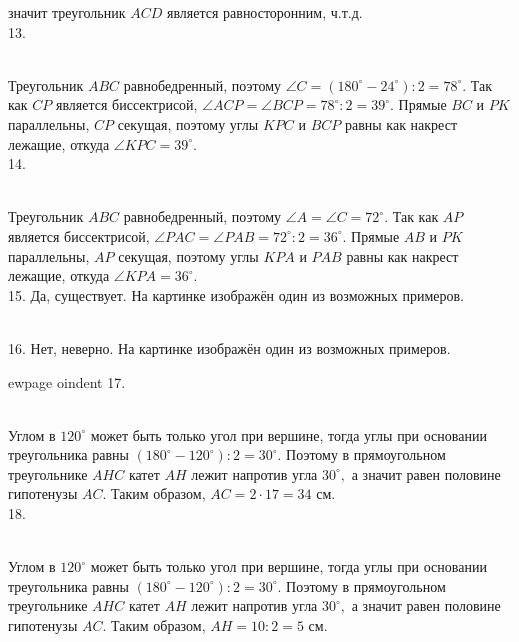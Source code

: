значит треугольник $ACD$ является равносторонним, ч.т.д.\\
13. \begin{figure}[ht!]
\end{figure}\\
Треугольник $ABC$ равнобедренный, поэтому $\angle C=(180^\circ-24^\circ):2=78^\circ.$ Так как $CP$ является биссектрисой, $\angle ACP=\angle BCP=78^\circ:2=39^\circ.$ Прямые $BC$ и $PK$ параллельны, $CP$ секущая, поэтому углы $KPC$ и $BCP$ равны как накрест лежащие, откуда $\angle KPC=39^\circ.$\\
14. \begin{figure}[ht!]
\end{figure}\\
Треугольник $ABC$ равнобедренный, поэтому $\angle A=\angle C =72^\circ.$ Так как $AP$ является биссектрисой, $\angle PAC=\angle PAB=72^\circ:2=36^\circ.$ Прямые $AB$ и $PK$ параллельны, $AP$ секущая, поэтому углы $KPA$ и $PAB$ равны как накрест лежащие, откуда $\angle KPA=36^\circ.$\\
15. Да, существует. На картинке изображён один из возможных примеров.
\begin{figure}[ht!]
\end{figure}\\
16. Нет, неверно. На картинке изображён один из возможных примеров.
\begin{figure}[ht!]
\end{figure}
ewpage
oindent
17. \begin{figure}[ht!]
\end{figure}\\
Углом в $120^\circ$ может быть только угол при вершине, тогда углы при основании треугольника равны $(180^\circ-120^\circ):2=30^\circ.$ Поэтому в прямоугольном треугольнике $AHC$ катет $AH$ лежит напротив угла $30^\circ,$ а значит равен половине гипотенузы $AC.$ Таким образом, $AC=2\cdot17=34$ см.\\
18. \begin{figure}[ht!]
\end{figure}\\
Углом в $120^\circ$ может быть только угол при вершине, тогда углы при основании треугольника равны $(180^\circ-120^\circ):2=30^\circ.$ Поэтому в прямоугольном треугольнике $AHC$ катет $AH$ лежит напротив угла $30^\circ,$ а значит равен половине гипотенузы $AC.$ Таким образом, $AH=10:2=5$ см.\\
